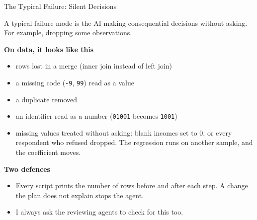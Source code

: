 \documentclass[svgnames,x11names,dvipsnames]{beamer}
\newcommand{\chg}[1]{{\bfseries #1}}
\renewcommand{\chg}[1]{#1}
\begin{document}
\begin{frame}{The Typical Failure: Silent Decisions}

A typical failure mode is the AI making consequential decisions without asking. For example, dropping some observations.

\vspace{0.3cm}

\textbf{On data, it looks like this}
\begin{itemize}
    \setlength{\itemsep}{3pt}
    \item rows lost in a merge (inner join instead of left join)
    \item a missing code (\texttt{-9}, \texttt{99}) read as a value
    \item a duplicate removed
    \item an identifier read as a number (\texttt{01001} becomes \texttt{1001})
    \item \chg{missing values treated without asking: blank incomes set to 0, or every respondent who refused dropped. The regression runs on another sample, and the coefficient moves.}
\end{itemize}

\vspace{0.3cm}

\textbf{Two defences}
\begin{itemize}
    \setlength{\itemsep}{3pt}
    \item Every script prints the number of rows before and after each step. A change the plan does not explain stops the agent.
    \item I always ask the reviewing agents to check for this too.
\end{itemize}

\end{frame}
\end{document}
